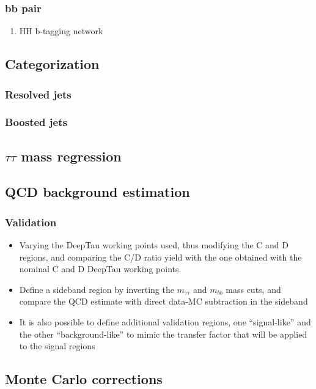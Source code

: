 \documentclass[11pt]{article}
\begin{document}
\subsubsection{bb pair}
\label{sec:org462da83}
\begin{enumerate}
\item HH b-tagging network
\label{sec:orgabcafbb}
\end{enumerate}
\subsection{Categorization}
\label{sec:orgb2e7b14}
\label{sec:categorization}
\subsubsection{Resolved jets}
\label{sec:orga4ba87b}
\subsubsection{Boosted jets}
\label{sec:org93c3416}
\subsection{\(\tau \tau\) mass regression}
\label{sec:org9fdf457}
\subsection{QCD background estimation}
\label{sec:orgff83746}
\subsubsection{Validation}
\label{sec:org8aa8a36}
\begin{itemize}
\item Varying the DeepTau working points used, thus modifying the C and D regions, and comparing the C/D ratio yield with the one obtained with the nominal C and D DeepTau working points.
\item Define a sideband region by inverting the \(m_{\tau\tau}\) and \(m_{bb}\) mass cuts, and compare the QCD estimate with direct data-MC subtraction in the sideband
\item It is also possible to define additional validation regions, one ``signal-like'' and the other ``background-like'' to mimic the transfer factor that will be applied to the signal regions
\end{itemize}
\subsection{Monte Carlo corrections}
\label{sec:org705880f}
\end{document}
